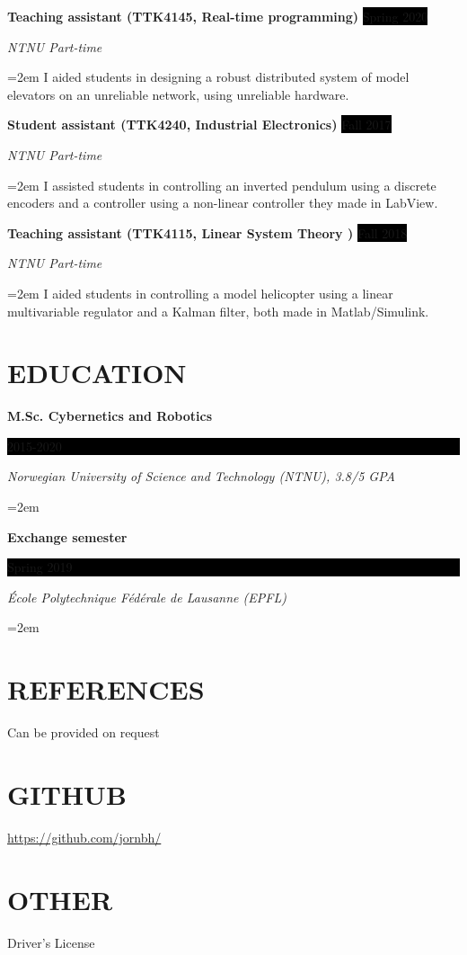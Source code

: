 \documentclass[paper=a4,fontsize=11pt,norsk]{scrartcl} %
\newlength{\spacebox}
\newcommand{\NewPart}[1]{\section*{\uppercase{#1}}}
\newcommand{\PersonalEntry}[2]{
		\noindent\hangindent=2em\hangafter=0 %
		\parbox{\spacebox}{        %
		\textit{#1}}		       %
		\hspace{1.5em} #2 \par}    %
\newcommand{\EducationEntry}[4]{
		\noindent \textbf{#1} \hfill      %
		\colorbox{Black}{%
			\parbox{6em}{%
			\hfill\color{White}#2}} \par  %
		\noindent \textit{#3} \par        %
		\noindent\hangindent=2em\hangafter=0 \small #4 %
		\normalsize \par}
\newcommand{\WorkEntry}[4]{				  %
		\noindent \textbf{#1} \hfill      %
		\colorbox{Black}{\color{White}#2} \par  %
		\noindent \textit{#3} \par              %
		\noindent\hangindent=2em\hangafter=0 \small #4 %
		\normalsize \par}
\begin{document}

\WorkEntry{Teaching assistant (TTK4145, Real-time programming)}{Spring 2020}{NTNU Part-time}
{I aided students in designing a robust distributed system of model elevators on an unreliable network, using unreliable hardware.}



\WorkEntry{Student assistant (TTK4240, Industrial Electronics)}{Fall 2017}{NTNU Part-time}
{
	I assisted students in controlling an inverted pendulum using a discrete encoders and a controller using a non-linear controller they made in LabView. 
}

\WorkEntry{Teaching assistant (TTK4115, Linear System Theory )}{Fall 2018}{NTNU Part-time}
{
	I aided students in controlling a model helicopter using a linear multivariable regulator and a Kalman filter, both made in Matlab/Simulink.
}


\NewPart{Education}{}

\EducationEntry{M.Sc. Cybernetics and Robotics}{2015-2020}{Norwegian University of Science and Technology (NTNU), 3.8/5 GPA}{}
\EducationEntry{Exchange semester}{Spring 2019}{École Polytechnique Fédérale de Lausanne (EPFL)}{}





\NewPart{References}{}
Can be provided on request



\NewPart{GitHub}{
\url{https://github.com/jornbh/}
}

\NewPart{Other}{}
Driver's License
\end{document}
